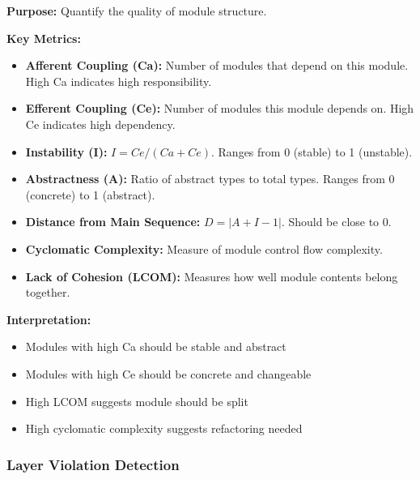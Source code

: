\documentclass[11pt,letterpaper]{article}
\begin{document}
\begin{definitionbox}
\textbf{Purpose:} Quantify the quality of module structure.

\textbf{Key Metrics:}

\begin{itemize}[nosep]
    \item \textbf{Afferent Coupling (Ca):} Number of modules that depend on this module. High Ca indicates high responsibility.
    
    \item \textbf{Efferent Coupling (Ce):} Number of modules this module depends on. High Ce indicates high dependency.
    
    \item \textbf{Instability (I):} $I = Ce / (Ca + Ce)$. Ranges from 0 (stable) to 1 (unstable).
    
    \item \textbf{Abstractness (A):} Ratio of abstract types to total types. Ranges from 0 (concrete) to 1 (abstract).
    
    \item \textbf{Distance from Main Sequence:} $D = |A + I - 1|$. Should be close to 0.
    
    \item \textbf{Cyclomatic Complexity:} Measure of module control flow complexity.
    
    \item \textbf{Lack of Cohesion (LCOM):} Measures how well module contents belong together.
\end{itemize}

\textbf{Interpretation:}
\begin{itemize}[nosep]
    \item Modules with high Ca should be stable and abstract
    \item Modules with high Ce should be concrete and changeable
    \item High LCOM suggests module should be split
    \item High cyclomatic complexity suggests refactoring needed
\end{itemize}
\end{definitionbox}

\subsubsection{Layer Violation Detection}
\end{document}
